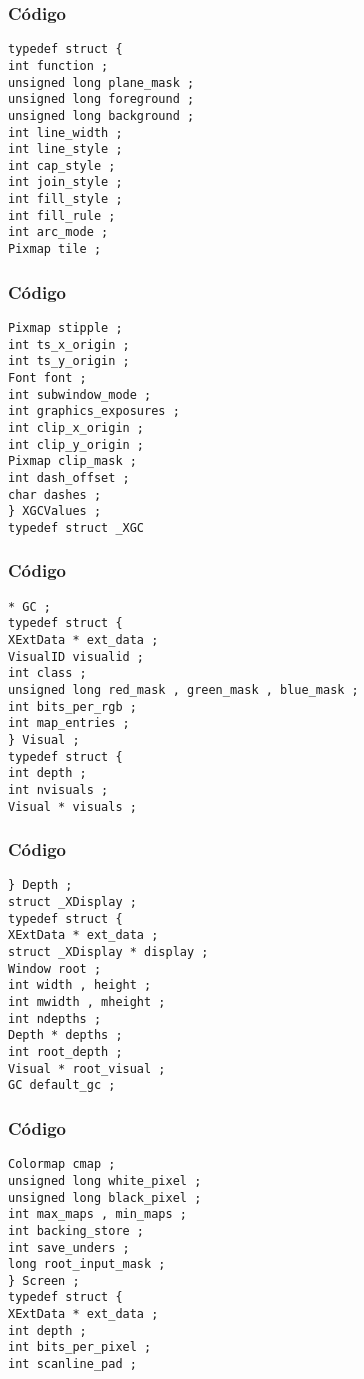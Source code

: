 \documentclass{beamer}
\begin{document}
\begin{frame}[fragile]
\frametitle{C\'odigo}
\begin{verbatim}
typedef struct { 
int function ; 
unsigned long plane_mask ; 
unsigned long foreground ; 
unsigned long background ; 
int line_width ; 
int line_style ; 
int cap_style ; 
int join_style ; 
int fill_style ; 
int fill_rule ; 
int arc_mode ; 
Pixmap tile ; 
\end{verbatim}
\end{frame}
\begin{frame}[fragile]
\frametitle{C\'odigo}
\begin{verbatim}
Pixmap stipple ; 
int ts_x_origin ; 
int ts_y_origin ; 
Font font ; 
int subwindow_mode ; 
int graphics_exposures ; 
int clip_x_origin ; 
int clip_y_origin ; 
Pixmap clip_mask ; 
int dash_offset ; 
char dashes ; 
} XGCValues ; 
typedef struct _XGC 
\end{verbatim}
\end{frame}
\begin{frame}[fragile]
\frametitle{C\'odigo}
\begin{verbatim}
* GC ; 
typedef struct { 
XExtData * ext_data ; 
VisualID visualid ; 
int class ; 
unsigned long red_mask , green_mask , blue_mask ; 
int bits_per_rgb ; 
int map_entries ; 
} Visual ; 
typedef struct { 
int depth ; 
int nvisuals ; 
Visual * visuals ; 
\end{verbatim}
\end{frame}
\begin{frame}[fragile]
\frametitle{C\'odigo}
\begin{verbatim}
} Depth ; 
struct _XDisplay ; 
typedef struct { 
XExtData * ext_data ; 
struct _XDisplay * display ; 
Window root ; 
int width , height ; 
int mwidth , mheight ; 
int ndepths ; 
Depth * depths ; 
int root_depth ; 
Visual * root_visual ; 
GC default_gc ; 
\end{verbatim}
\end{frame}
\begin{frame}[fragile]
\frametitle{C\'odigo}
\begin{verbatim}
Colormap cmap ; 
unsigned long white_pixel ; 
unsigned long black_pixel ; 
int max_maps , min_maps ; 
int backing_store ; 
int save_unders ; 
long root_input_mask ; 
} Screen ; 
typedef struct { 
XExtData * ext_data ; 
int depth ; 
int bits_per_pixel ; 
int scanline_pad ; 
\end{verbatim}
\end{frame}
\end{document}
